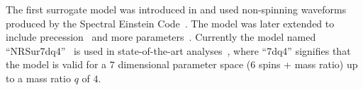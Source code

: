 The first surrogate model was introduced in \cite{Blackman:2015pia} and used non-spinning waveforms produced by the Spectral Einstein Code~\cite{Scheel:2014ina, Szilagyi:2014fna}. The model was later extended to include precession~\cite{Blackman:2017dfb} and more parameters~\cite{Blackman:2017pcm, Varma:2018aht}. Currently the model named ``NRSur7dq4''~\cite{Varma:2019csw} is used in state-of-the-art analyses~\cite{LIGOScientific:2021djp}, where ``7dq4'' signifies that the model is valid for a $7$ dimensional parameter space (6 spins + mass ratio) up to a mass ratio $q$ of $4$.
